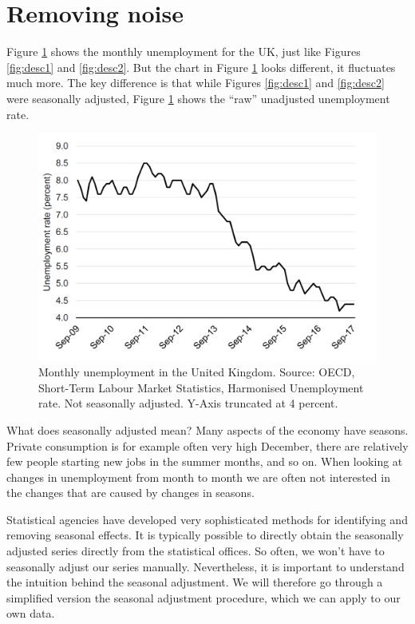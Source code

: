 \documentclass[]{book}
\begin{document}
\hypertarget{removing-noise}{%
\section{Removing noise}\label{removing-noise}}

Figure \ref{fig:desc4} shows the monthly unemployment for the UK, just like Figures \ref{fig:desc1} and \ref{fig:desc2}. But the chart in Figure \ref{fig:desc4} looks different, it fluctuates much more. The key difference is that while Figures \ref{fig:desc1} and \ref{fig:desc2} were seasonally adjusted, Figure \ref{fig:desc4} shows the ``raw'' unadjusted unemployment rate.

\begin{figure}

{\centering \includegraphics[width=0.9\linewidth]{_resources/chapter_describe/ex2_1} 

}

\caption{Monthly unemployment in the United Kingdom. Source: OECD, Short-Term Labour Market Statistics, Harmonised Unemployment rate. Not seasonally adjusted. Y-Axis truncated at 4 percent.}\label{fig:desc4}
\end{figure}

What does seasonally adjusted mean? Many aspects of the economy have seasons. Private consumption is for example often very high December, there are relatively few people starting new jobs in the summer months, and so on. When looking at changes in unemployment from month to month we are often not interested in the changes that are caused by changes in seasons.

Statistical agencies have developed very sophisticated methods for identifying and removing seasonal effects. It is typically possible to directly obtain the seasonally adjusted series directly from the statistical offices. So often, we won't have to seasonally adjust our series manually. Nevertheless, it is important to understand the intuition behind the seasonal adjustment. We will therefore go through a simplified version the seasonal adjustment procedure, which we can apply to our own data.
\end{document}
